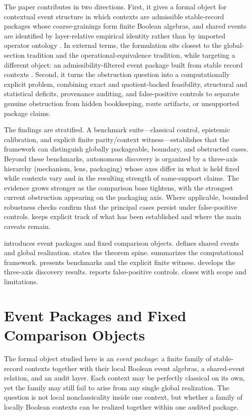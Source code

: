 \documentclass[11pt]{article}
\theoremstyle{definition}
\begin{document}
The paper contributes in two directions. First, it gives a formal object for contextual event structure in which contexts are admissible stable-record packages whose coarse-grainings form finite Boolean algebras, and shared events are identified by layer-relative empirical identity rather than by imported operator ontology \citep{Tsiokos2026Foundations,Tsiokos2026Quantum}. In external terms, the formulation sits closest to the global-section tradition and the operational-equivalence tradition, while targeting a different object: an admissibility-filtered event package built from stable record contexts \citep{AbramskyBrandenburger2011Sheaf,Spekkens2005Contextuality,SchmidEtAl2021Noncontextuality}. Second, it turns the obstruction question into a computationally explicit problem, combining exact and quotient-backed feasibility, structural and statistical deficits, provenance auditing, and false-positive controls to separate genuine obstruction from hidden bookkeeping, route artifacts, or unsupported package claims.

The findings are stratified. A benchmark suite---classical control, epistemic calibration, and explicit finite parity/context witness---establishes that the framework can distinguish globally packageable, boundary, and obstructed cases. Beyond these benchmarks, autonomous discovery is organized by a three-axis hierarchy (mechanism, lens, packaging) whose axes differ in what is held fixed while contexts vary and in the resulting strength of same-support claims. The evidence grows stronger as the comparison base tightens, with the strongest current obstruction appearing on the packaging axis. Where applicable, bounded robustness checks confirm that the principal cases persist under false-positive controls.  keeps explicit track of what has been established and where the main caveats remain.

 introduces event packages and fixed comparison objects.  defines shared events and global realization.  states the theorem spine.  summarizes the computational framework.  presents benchmarks and the explicit finite witness.  develops the three-axis discovery results.  reports false-positive controls.  closes with scope and limitations.

\section{Event Packages and Fixed Comparison Objects}\label{sec:event-packages}
The formal object studied here is an \emph{event package}: a finite family of stable-record contexts together with their local Boolean event algebras, a shared-event relation, and an audit layer. Each context may be perfectly classical on its own, yet the family may still fail to arise from any single global realization. The question is not local nonclassicality inside one context, but whether a family of locally Boolean contexts can be realized together within one audited package.
\end{document}
